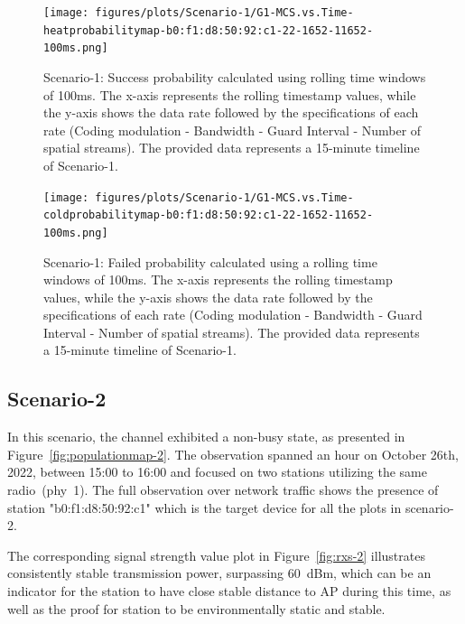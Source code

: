 \begin{landscape}
\begin{figure}[hbt!]
  \centering
  \texttt{[image: figures/plots/Scenario-1/G1-MCS.vs.Time-heatprobabilitymap-b0:f1:d8:50:92:c1-22-1652-11652-100ms.png]}
  \caption[Rate-Based Transmission Success Analysis with Rolling Time Averages]{Scenario-1: Success probability calculated using rolling time windows of 100ms. The x-axis represents the rolling timestamp values, while the y-axis shows the data rate followed by the specifications of each rate (Coding modulation - Bandwidth - Guard Interval - Number of spatial streams). The provided data represents a 15-minute timeline of Scenario-1.}
  \label{fig:Rolling-Success1}
\end{figure}
\FloatBarrier 
\end{landscape}


\begin{landscape}
\begin{figure}[hbt!]
  \centering
  \texttt{[image: figures/plots/Scenario-1/G1-MCS.vs.Time-coldprobabilitymap-b0:f1:d8:50:92:c1-22-1652-11652-100ms.png]}
  \caption[Rate-Based Transmission Failure Analysis with Rolling Time Averages]{Scenario-1: Failed probability calculated using a rolling time windows of 100ms. The x-axis represents the rolling timestamp values, while the y-axis shows the data rate followed by the specifications of each rate (Coding modulation - Bandwidth - Guard Interval - Number of spatial streams). The provided data represents a 15-minute timeline of Scenario-1.}
  \label{fig:Rolling-Fail1}
\end{figure}
\FloatBarrier 
\end{landscape}




\subsection{Scenario-2 }
\label{sec:Analysis and Optimization:Performance Evaluation:Scenario2}
In this scenario, the channel exhibited a non-busy state, as presented in Figure~\ref{fig:populationmap-2}. The observation spanned an hour on October 26th, 2022, between 15:00 to 16:00 and focused on two stations utilizing the same radio~(phy~1). The full observation over network traffic shows the presence of station "b0:f1:d8:50:92:c1"\cite{SNCX_internal_note} which is the target device for all the plots in scenario-2.

The corresponding signal strength value plot in Figure~\ref{fig:rxs-2} illustrates consistently stable transmission power, surpassing 60~dBm, which can be an indicator for the station to have close stable distance to AP during this time, as well as the proof for station to be environmentally static and stable.

